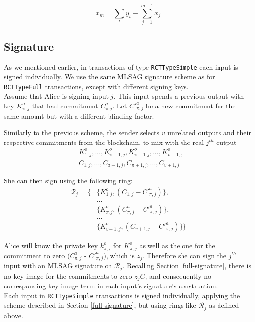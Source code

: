 \[x_m = \sum_t y_t - \sum_{j=1}^{m-1} x_j  \]




\subsection{Signature}

As we mentioned earlier, in transactions of type {\tt RCTTypeSimple} each input is signed individually. We use the same MLSAG signature scheme as for {\tt RCTTypeFull} transactions, except with different signing keys.
\\

Assume that Alice is signing input $j$. This input spends a previous output with key $K^o_{\pi,j}$ that had commitment $C^a_{\pi,j}$. Let $C'^a_{\pi,j}$ be a new commitment for the same amount but with a different blinding factor.

Similarly to the previous scheme, the sender selects $v$ unrelated outputs and their respective commitments from the blockchain, to mix with the real $j^{th}$ output
\begin{align*}
& K^o_{1, j}, ..., K^o_{\pi-1, j}, K^o_{\pi+1, j}, ..., K^o_{v+1, j} \\
& C_{1, j}, ..., C_{\pi-1, j}, C_{\pi+1, j}, ..., C_{v+1, j}
\end{align*}


She can then sign using the following ring:
\begin{align*}
\mathcal{R}_j = \{ &\{K^o_{1, j}, (C_{1, j} - C'^a_{\pi, j})\}, \\
&... \\
&\{ K^o_{\pi, j}, (C^a_{\pi, j} - C'^a_{\pi, j})\}, \\
&... \\
&\{ K^o_{v+1, j}, (C_{v+1, j} - C'^a_{\pi, j})\}\}
\end{align*}


Alice will know the private key $k^o_{\pi,j}$ for $K^o_{\pi,j}$ as well as the one for the commitment to zero $(C^a_{\pi,j}$ - $C'^a_{\pi,j})$, which is $z_j$. Therefore she can sign the $j^{th}$ input with an MLSAG signature on $\mathcal{R}_j$. Recalling Section \ref{full-signature}, there is no key image for the commitments to zero $z_j G$, and consequently no corresponding key image term in each input’s signature’s construction.
\\

Each input in {\tt RCTTypeSimple} transactions is signed individually, applying the scheme described in Section \ref{full-signature}, but using rings like \(\mathcal{R}_j\) as defined above.


